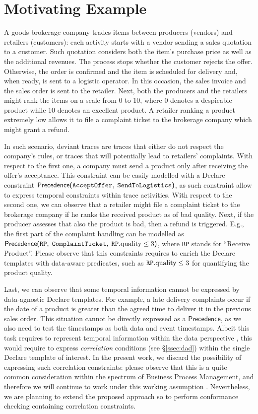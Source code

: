 \section{Motivating Example}\label{sec:mot}
A goods brokerage company \cite{PetermannJMR14} trades items between producers (vendors) and retailers (customers): each activity starts with a vendor sending a sales quotation to a customer. Such quotation considers both the item's purchase price as well as the additional revenues. The process stops whether the customer rejects the offer. Otherwise, the order is confirmed and the item is scheduled for delivery and, when ready, is sent to a logistic operator. In this occasion, the sales invoice and the sales order is sent to the retailer. Next, both the producers and the retailers might rank the items on a scale from 0 to 10, where 0 denotes a despicable product while 10 denotes an excellent product. A retailer ranking a product extremely low allows it to file a complaint ticket to the brokerage company which might grant a refund. 

In such scenario, deviant traces are traces that either do not respect the company's rules, or traces that will potentially lead to retailers' complaints. With respect to the first one, a company must send a product only after receiving the offer's acceptance. This constraint can be easily modelled with a Declare constraint $\textsf{Precedence(}\texttt{AcceptOffer},\;\texttt{SendToLogistics}\textsf{)}$, as such constraint allow to express temporal constraints within trace activities. With respect to the second one, we can observe that a retailer might file a complaint ticket to the brokerage company if he ranks the received product as of bad quality. Next, if the producer assesses that also the product is bad, then a refund is triggered. E.g., the first part of the complaint handling can be modelled as $\textsf{Precedence(}\texttt{RP},\;\texttt{ComplaintTicket},\;\texttt{RP}.\textup{quality}\leq 3\textsf{)}$, where \texttt{RP} stands for ``Receive Product''. Please observe that this constraints requires to enrich the Declare templates with data-aware predicates, such as  $\texttt{RP}.\textup{quality}\leq 3$ for quantifying the product quality. 


Last, we can observe that some temporal information cannot be expressed by data-agnostic Declare templates. For example, a late delivery complaints occur if the date of a product is greater than the agreed time to deliver it in the previous sales order. This situation cannot be directly expressed as a $\textsf{Precedence}$, as we also need to test the timestamps as both data and event timestamps. Albeit this task requires to represent temporal information within the data perspective \cite{MultiPerspective}, this would require to express \textit{correlation} conditions (see \S\ref{ssec:dad}) within the single Declare template of interest. In the present work, we discard the possibility of expressing such correlation constraints: please observe that this is a quite common consideration within the spectrum of Business Process Management, and therefore we will continue to work under this working assumption \cite{10.1007/978-3-642-40176-3_8}. Nevertheless, we are planning to extend the proposed approach so to perform conformance checking containing correlation constraints.